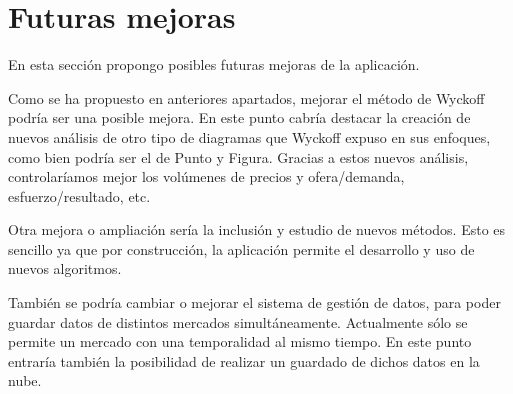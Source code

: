 \section{Futuras mejoras}

En esta sección propongo posibles futuras mejoras de la aplicación.\newline

Como se ha propuesto en anteriores apartados, mejorar el método de Wyckoff podría ser una posible mejora. En este punto cabría destacar la creación de nuevos análisis de otro tipo de diagramas que Wyckoff expuso en sus enfoques, como bien podría ser el de Punto y Figura. Gracias a estos nuevos análisis, controlaríamos mejor los volúmenes de precios y ofera/demanda, esfuerzo/resultado, etc.\newline

Otra mejora o ampliación sería la inclusión y estudio de nuevos métodos. Esto es sencillo ya que por construcción, la aplicación permite el desarrollo y uso de nuevos algoritmos.\newline

También se podría cambiar o mejorar el sistema de gestión de datos, para poder guardar datos de distintos mercados simultáneamente. Actualmente sólo se permite un mercado con una temporalidad al mismo tiempo. En este punto entraría también la posibilidad de realizar un guardado de dichos datos en la nube.\newline